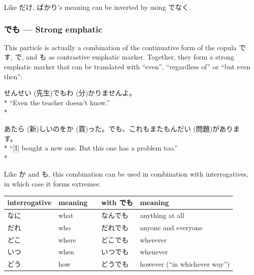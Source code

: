 \documentclass[11pt, b5paper, twoside, openright, onecolumn]{book}
\makeatletter
\newcommand*{\rubystack}[2]{{\relscale{0.5}%
  \begin{tabular}[b]{@{}c@{}}%
    {#1}\\%
   {\textscale{2}{#2}}%
  \end{tabular}}%
}
\DeclareRobustCommand*{\ruby}[2]{%
  \mbox{%
    \setlength{\parskip}{0ex}%
    \BeginAccSupp{method=pdfstringdef,ActualText={#1}}%
      \rubystack{\phantom{#2}}{#1}%
      \llap{%
        \rubystack{#2}{\phantom{#1}}%
      }%
    \EndAccSupp{}%
  }%
}
\renewcommand*{\ruby}[2]{#2 (#1)}%
\newenvironment{exampleblock}{
\setlength{\parindent}{0.6in}
\begin{minipage}[t]{\dimexpr\textwidth-\parindent}}
{\end{minipage}}
\newenvironment{mytabular}[1]{\noindent\hspace{0.4in}
\begin{tabular}[h]{#1}}{\end{tabular}}
\makeatother
\begin{document}
Like だけ‚ ばかり’s meaning can be inverted by using でなく.

\subsubsection{でも — Strong emphatic}

This particle is actually a combination of the continuative form of the copula です‚ で‚ and も as contrastive emphatic marker. Together‚ they form a strong emphatic marker that can be translated with “even”‚ “regardless of” or “but even then”:

\vspace{0.4cm}
\begin{exampleblock}
\ruby{先生}{せんせい}でも\ruby{分}{わ}かりませんよ。 \\* 
“Even the teacher doesn’t know.” \\* 
\end{exampleblock}
\vspace{0.2cm}

\begin{exampleblock}
\ruby{新}{あたら}しいのを\ruby{買}{か}った。でも、これもまた\ruby{問題}{もんだい}があります。 \\* 
“[I] bought a new one. But this one has a problem too.” \\* 
\end{exampleblock}
\vspace{0.2cm}

Like か and も‚ this combination can be used in combination with interrogatives‚ in which case it forms extremes:

\vspace{0.5cm}
\smaller
\begin{mytabular}{| l  l  l  l  l |}\hline 
\rule{0pt}{2.4ex}interrogative & meaning &  & with でも & meaning\\ 
\hline
\rule{0pt}{2.4ex}なに & what &  & なんでも & anything at all\\ 
\rule{0pt}{2.4ex}だれ & who &  & だれでも & anyone and everyone\\ 
\rule{0pt}{2.4ex}どこ & where &  & どこでも & wherever\\ 
\rule{0pt}{2.4ex}いつ & when &  & いつでも & whenever\\ 
\rule{0pt}{2.4ex}どう & how &  & どうでも & however (“in whichever way”)\\ 
\hline 
\end{mytabular}
\larger
\vspace{0.5cm}
\end{document}
